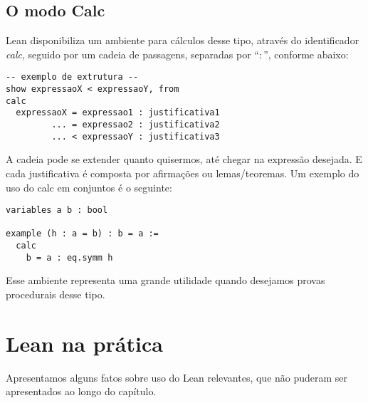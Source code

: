\subsection{O modo Calc}
Lean disponibiliza um ambiente para cálculos desse tipo, através do identificador \textit{calc}, seguido por um cadeia de passagens, separadas por ``$:$'', conforme abaixo:

\vspace{5mm}
\begin{lstlisting}
-- exemplo de extrutura --
show expressaoX < expressaoY, from
calc
  expressaoX = expressao1 : justificativa1
         ... = expressao2 : justificativa2
         ... < expressaoY : justificativa3
\end{lstlisting}
\vspace{5mm}

\noindent A cadeia pode se extender quanto quisermos, até chegar na expressão desejada. E cada justificativa é composta por afirmações ou lemas/teoremas. Um exemplo do uso do {\selectfont calc} em conjuntos é o seguinte:

\vspace{5mm}
\begin{lstlisting}
variables a b : bool

example (h : a = b) : b = a :=
  calc
    b = a : eq.symm h
\end{lstlisting}
\vspace{5mm}

\noindent Esse ambiente representa uma grande utilidade quando desejamos provas procedurais desse tipo.

\section{Lean na prática}
Apresentamos alguns fatos sobre uso do Lean relevantes, que não puderam ser apresentados ao longo do capítulo.

